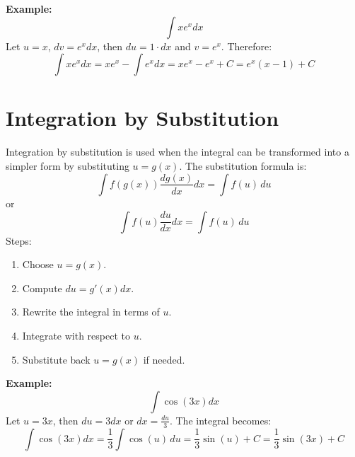 \documentclass[]{article}
\begin{document}
	\noindent \textbf{Example:}
	$$
	\int x e^x dx
	$$
	Let $u = x$, $dv = e^x dx$, then $du = 1 \cdot dx$ and $v = e^x$. Therefore:
	$$
	\int x e^x dx = x e^x - \int e^x dx = x e^x - e^x + C = e^x(x-1) + C
	$$
	
	\section{Integration by Substitution}
	Integration by substitution is used when the integral can be transformed into a simpler form by substituting $u = g(x)$. The substitution formula is:
	$$
	\int f(g(x)) \frac{d g(x)}{dx} dx = \int f(u)\,du
	$$
	or
	$$
	\int f(u) \frac{du}{dx} dx = \int f(u)\,du
	$$
	Steps:
	\begin{enumerate}
		\item Choose $u = g(x)$.
		\item Compute $du = g'(x) dx$.
		\item Rewrite the integral in terms of $u$.
		\item Integrate with respect to $u$.
		\item Substitute back $u = g(x)$ if needed.
	\end{enumerate}
	\textbf{Example:}
	$$
	\int \cos(3x) dx
	$$
	Let $u = 3x$, then $du = 3 dx$ or $dx = \frac{du}{3}$.
	The integral becomes:
	$$
	\int \cos(3x) dx = \frac{1}{3} \int \cos(u)\,du = \frac{1}{3}\sin(u) + C = \frac{1}{3}\sin(3x) + C
	$$
	
	
\end{document}
